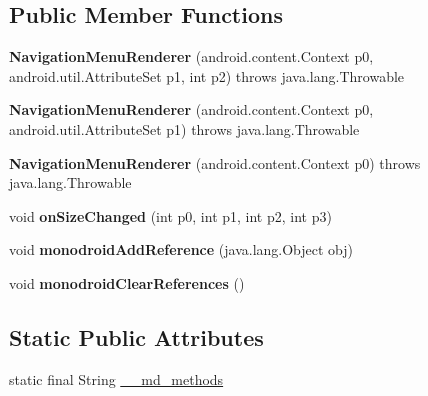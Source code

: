 \subsection*{Public Member Functions}
\begin{DoxyCompactItemize}
\item 
\mbox{\label{classmd5b60ffeb829f638581ab2bb9b1a7f4f3f_1_1NavigationMenuRenderer_ae74ab61a213bee8a3bbfcd4d6caa561c}} 
{\bfseries Navigation\+Menu\+Renderer} (android.\+content.\+Context p0, android.\+util.\+Attribute\+Set p1, int p2)  throws java.\+lang.\+Throwable 	
\item 
\mbox{\label{classmd5b60ffeb829f638581ab2bb9b1a7f4f3f_1_1NavigationMenuRenderer_ad19d1ffa5f6f7658e40c2aad315f1531}} 
{\bfseries Navigation\+Menu\+Renderer} (android.\+content.\+Context p0, android.\+util.\+Attribute\+Set p1)  throws java.\+lang.\+Throwable 	
\item 
\mbox{\label{classmd5b60ffeb829f638581ab2bb9b1a7f4f3f_1_1NavigationMenuRenderer_ab221cd03a920958ca9a3c7cce213642f}} 
{\bfseries Navigation\+Menu\+Renderer} (android.\+content.\+Context p0)  throws java.\+lang.\+Throwable 	
\item 
\mbox{\label{classmd5b60ffeb829f638581ab2bb9b1a7f4f3f_1_1NavigationMenuRenderer_a9eb26dd23dc63aa4a5652b61f28def49}} 
void {\bfseries on\+Size\+Changed} (int p0, int p1, int p2, int p3)
\item 
\mbox{\label{classmd5b60ffeb829f638581ab2bb9b1a7f4f3f_1_1NavigationMenuRenderer_a28a29aa89bcd264a300fc518ddef9f73}} 
void {\bfseries monodroid\+Add\+Reference} (java.\+lang.\+Object obj)
\item 
\mbox{\label{classmd5b60ffeb829f638581ab2bb9b1a7f4f3f_1_1NavigationMenuRenderer_a8d79995c853bf4f40da4f067cd501048}} 
void {\bfseries monodroid\+Clear\+References} ()
\end{DoxyCompactItemize}
\subsection*{Static Public Attributes}
\begin{DoxyCompactItemize}
\item 
static final String \hyperlink{classmd5b60ffeb829f638581ab2bb9b1a7f4f3f_1_1NavigationMenuRenderer_a0f4bfebe2cdfd607a2a7599e832cfbdc}{\+\_\+\+\_\+md\+\_\+methods}
\end{DoxyCompactItemize}
